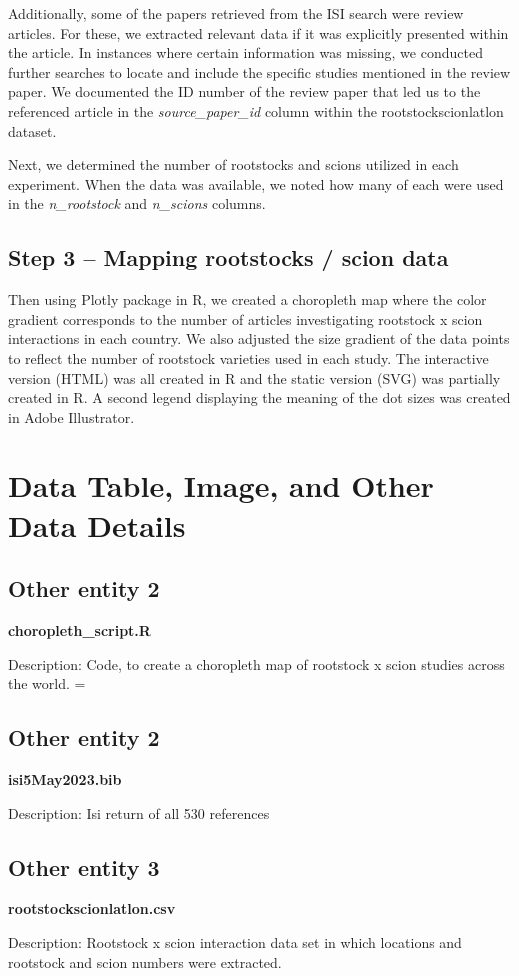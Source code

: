 \documentclass[11pt, oneside]{article}   	%
\begin{document}
Additionally, some of the papers retrieved from the ISI search were review articles. For these, we extracted relevant data if it was explicitly presented within the article. In instances where certain information was missing, we conducted further searches to locate and include the specific studies mentioned in the review paper. We documented the ID number of the review paper that led us to the referenced article in the \emph{source\_paper\_id} column within the rootstockscionlatlon dataset.

Next, we determined the number of rootstocks and scions utilized in each experiment. When the data was available, we noted how many of each were used in the \emph{n\_rootstock} and \emph{n\_scions} columns.

\subsection{Step 3 – Mapping rootstocks / scion data}
Then using Plotly package in R, we created a choropleth map where the color gradient corresponds to the number of articles investigating rootstock x scion interactions in each country. We also adjusted the size gradient of the data points to reflect the number of rootstock varieties used in each study. The interactive version (HTML) was all created in R and the static version (SVG) was partially created in R. A second legend displaying the meaning of the dot sizes was created in Adobe Illustrator.

\section{Data Table, Image, and Other Data Details}
\subsection{Other entity 2}
\textbf{choropleth\_script.R} %

Description:
Code, to create a choropleth map of rootstock x scion studies across the world. =
\subsection{Other entity 2}
\textbf{isi5May2023.bib}

Description:
Isi return of all 530 references
\subsection{Other entity 3}
\textbf{rootstockscionlatlon.csv}

Description:
Rootstock x scion interaction data set in which locations and rootstock and scion numbers were extracted.
\end{document}
